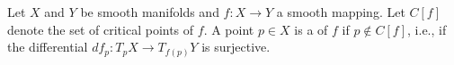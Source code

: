 Let $X$ and $Y$ be smooth manifolds and $f: X \to Y$ a smooth mapping. Let $C[f]$ denote the set of critical points of $f$. A point $p \in X$ is a  of $f$ if $p \notin C[f]$, i.e., if the differential $df_p: T_p X \to T_{f(p)} Y$ is surjective.
